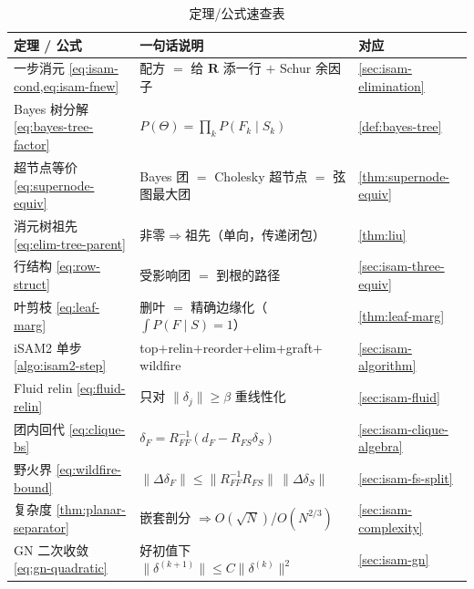 \begin{table}[H]\centering\small
\caption{定理/公式速查表}
\begin{tabular}{lll}
\toprule
定理 / 公式 & 一句话说明 & 对应 \\
\midrule
一步消元 \cref{eq:isam-cond,eq:isam-fnew} & 配方 $=$ 给 $\mathbf{R}$ 添一行 $+$ Schur 余因子 & \cref{sec:isam-elimination} \\
Bayes 树分解 \cref{eq:bayes-tree-factor} & $P(\Theta)=\prod_k P(F_k\mid S_k)$ & \cref{def:bayes-tree} \\
超节点等价 \cref{eq:supernode-equiv} & Bayes 团 $=$ Cholesky 超节点 $=$ 弦图最大团 & \cref{thm:supernode-equiv} \\
消元树祖先 \cref{eq:elim-tree-parent} & 非零$\Rightarrow$祖先（单向，传递闭包） & \cref{thm:liu} \\
行结构 \cref{eq:row-struct} & 受影响团 $=$ 到根的路径 & \cref{sec:isam-three-equiv} \\
叶剪枝 \cref{eq:leaf-marg} & 删叶 $=$ 精确边缘化（$\int P(F\mid S)=1$） & \cref{thm:leaf-marg} \\
iSAM2 单步 \cref{algo:isam2-step} & top$+$relin$+$reorder$+$elim$+$graft$+$wildfire & \cref{sec:isam-algorithm} \\
Fluid relin \cref{eq:fluid-relin} & 只对 $\|\delta_j\|\ge\beta$ 重线性化 & \cref{sec:isam-fluid} \\
团内回代 \cref{eq:clique-bs} & $\delta_F=R_{FF}^{-1}(d_F-R_{FS}\delta_S)$ & \cref{sec:isam-clique-algebra} \\
野火界 \cref{eq:wildfire-bound} & $\|\Delta\delta_F\|\le\|R_{FF}^{-1}R_{FS}\|\,\|\Delta\delta_S\|$ & \cref{sec:isam-fs-split} \\
复杂度 \cref{thm:planar-separator} & 嵌套剖分 $\Rightarrow O(\sqrt N)$/$O(N^{2/3})$ & \cref{sec:isam-complexity} \\
GN 二次收敛 \cref{eq:gn-quadratic} & 好初值下 $\|\delta^{(k+1)}\|\le C\|\delta^{(k)}\|^2$ & \cref{sec:isam-gn} \\
\bottomrule
\end{tabular}
\end{table}

